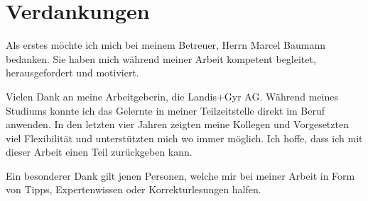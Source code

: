 \chapter*{Verdankungen}

Als erstes möchte ich mich bei meinem Betreuer, Herrn Marcel Baumann bedanken.
Sie haben mich während meiner Arbeit kompetent begleitet, herausgefordert und motiviert.

Vielen Dank an meine Arbeitgeberin, die Landis+Gyr AG.
Während meines Studiums konnte ich das Gelernte in meiner Teilzeitstelle direkt im Beruf anwenden.
In den letzten vier Jahren zeigten meine Kollegen und Vorgesetzten viel Flexibilität und unterstützten mich wo immer möglich.
Ich hoffe, dass ich mit dieser Arbeit einen Teil zurückgeben kann.

Ein besonderer Dank gilt jenen Personen, welche mir bei meiner Arbeit in Form von Tipps, Expertenwissen oder Korrekturlesungen halfen.